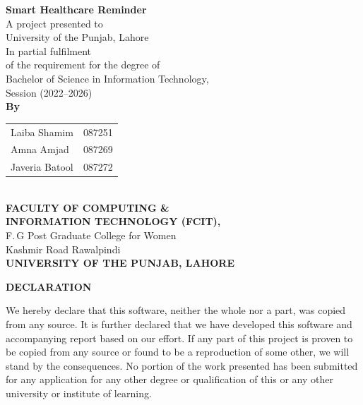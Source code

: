 \documentclass[12pt, a4paper, oneside]{report}
\begin{document}
\newpage
\thispagestyle{empty}
\begin{center}
\vspace*{1cm}
{\Large\bfseries Smart Healthcare Reminder}\\[0.5cm]
A project presented to\\
University of the Punjab, Lahore\\[0.5cm]
In partial fulfilment\\
of the requirement for the degree of\\[0.3cm]
{\large Bachelor of Science in Information Technology,\\
Session (2022--2026)}\\[0.5cm]
\textbf{By}\\[0.3cm]
\begin{tabular}{l l}
Laiba Shamim & 087251 \\
Amna Amjad & 087269 \\
Javeria Batool & 087272 \\
\end{tabular}\\[1cm]
\textbf{FACULTY OF COMPUTING \&\\
INFORMATION TECHNOLOGY (FCIT),}\\
F.\,G Post Graduate College for Women\\
Kashmir Road Rawalpindi\\
\textbf{UNIVERSITY OF THE PUNJAB, LAHORE}
\end{center}
\vfill

\newpage
\thispagestyle{empty}
\begin{center}
{\Large\bfseries DECLARATION}
\end{center}
\vspace{1cm}

We hereby declare that this software, neither the whole nor a part, was copied from any source. It is further declared that we have developed this software and accompanying report based on our effort. If any part of this project is proven to be copied from any source or found to be a reproduction of some other, we will stand by the consequences. No portion of the work presented has been submitted for any application for any other degree or qualification of this or any other university or institute of learning.
\end{document}
